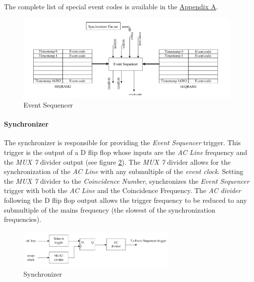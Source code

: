 \documentclass[openany]{article}
\begin{document}
			\paragraph{} The complete list of special event codes is available in the \hyperref[app:special-events]{Appendix A}.

			\begin{figure}[!h]
			\caption{Event Sequencer}
			\label{fig:event-sequencer}
			\centering
			\includegraphics[width=1.0\textwidth]{event-sequencer-image}
			\end{figure}

			\paragraph{Synchronizer}\label{synchronizer} The synchronizer is responsible for providing the \emph{Event Sequencer} trigger. This trigger is the output of a D flip flop whose inputs are the \emph{AC Line} frequency and the \emph{MUX 7} divider output (see figure \ref{fig:synchronizer}). The \emph{MUX 7} divider allows for the synchronization of the \emph{AC Line} with any submultiple of the \emph{event clock}. Setting the \emph{MUX 7} divider to the \emph{Coincidence Number}, synchronizes the \emph{Event Sequencer} trigger with both the \emph{AC Line} and the {Coincidence Frequency}. The \emph{AC divider} following the D flip flop output allows the trigger frequency to be reduced to any submultiple of the mains frequency (the slowest of the synchronization frequencies).
			\begin{figure}[!h]
			\caption{Synchronizer}
			\label{fig:synchronizer}
			\centering
			\includegraphics[width=0.7\textwidth]{synchronizer-image}
			\end{figure}
\end{document}

